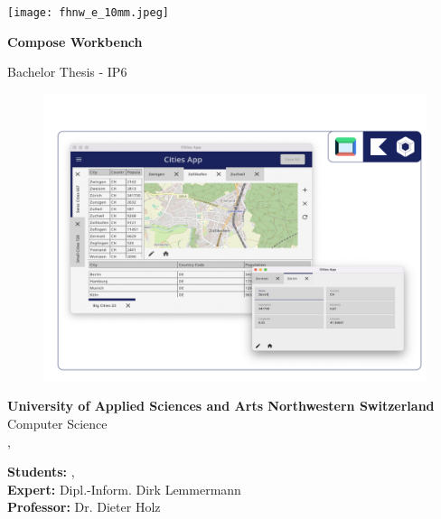 \vspace*{-18mm}\hspace*{-7mm}\texttt{[image: fhnw\_e\_10mm.jpeg]}

    \begin{center}
        \vspace{8mm}
        \Huge
        \textbf{Compose Workbench}
        
        \LARGE
        Bachelor Thesis - IP6
        
        \begin{figure}[H]
            \includegraphics[width=1\linewidth]{images/image-title-3.png}
        \end{figure}

        \vspace{6mm}

        \Large
        \textbf{University of Applied Sciences and Arts Northwestern Switzerland}\\[5pt]
        Computer Science\\[6pt]
        \closinglocation, \closingdate
    \end{center}
    \vspace{6mm}
    \large
    \textbf{Students:} \tab \authorA, \authorB\\[3pt]
    \textbf{Expert:} \tab Dipl.-Inform. Dirk Lemmermann\\[3pt]
    \textbf{Professor:} \tab Dr. Dieter Holz\\[3pt]